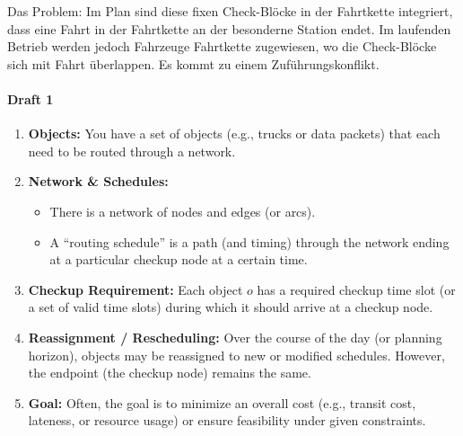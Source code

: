 Das Problem: Im Plan sind diese fixen Check-Blöcke in der Fahrtkette integriert, dass eine Fahrt in der Fahrtkette an der besonderne Station endet. 
Im laufenden Betrieb werden jedoch Fahrzeuge Fahrtkette zugewiesen, wo die Check-Blöcke sich mit Fahrt überlappen. Es kommt zu einem Zuführungskonflikt.


	
\paragraph{Draft 1}
\begin{enumerate}
  \item \textbf{Objects:} You have a set of objects (e.g., trucks or data packets) that each need to be routed through a network.
  \item \textbf{Network \& Schedules:}
    \begin{itemize}
      \item There is a network of nodes and edges (or arcs).
      \item A ``routing schedule'' is a path (and timing) through the network ending at a particular checkup node at a certain time.
    \end{itemize}
  \item \textbf{Checkup Requirement:} Each object $o$ has a required checkup time slot (or a set of valid time slots) during which it should arrive at a checkup node.
  \item \textbf{Reassignment / Rescheduling:} Over the course of the day (or planning horizon), objects may be reassigned to new or modified schedules. However, the endpoint (the checkup node) remains the same.
  \item \textbf{Goal:} Often, the goal is to minimize an overall cost (e.g., transit cost, lateness, or resource usage) or ensure feasibility under given constraints.
\end{enumerate}

